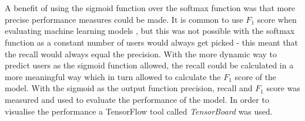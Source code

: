 \\\\
A benefit of using the sigmoid function over the softmax function was that more precise performance measures could be made. It is common to use $F_1$ score when evaluating machine learning models \parencite{yang1999re}, but this was not possible with the softmax function as a constant number of users would always get picked - this meant that the recall would always equal the precision. With the more dynamic way to predict users as the sigmoid function allowed, the recall could be calculated in a more meaningful way which in turn allowed to calculate the $F_1$ score of the model. With the sigmoid as the output function precision, recall and $F_1$ score was measured and used to evaluate the performance of the model. In order to visualise the performance a TensorFlow tool called \textit{TensorBoard} was used.
